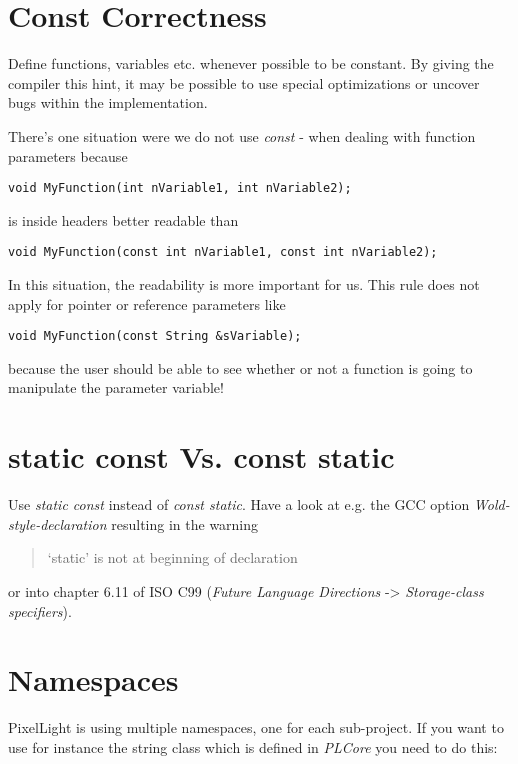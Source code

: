 \section{Const Correctness}
Define functions, variables etc. whenever possible to be constant. By giving the compiler this hint, it may be possible to use special optimizations or uncover bugs within the implementation.

There's one situation were we do not use \emph{const} - when dealing with function parameters because

\begin{lstlisting}[caption=Function parameters]
void MyFunction(int nVariable1, int nVariable2);
\end{lstlisting}

is inside headers better readable than

\begin{lstlisting}[caption=Constant function parameters]
void MyFunction(const int nVariable1, const int nVariable2);
\end{lstlisting}

In this situation, the readability is more important for us. This rule does not apply for pointer or reference parameters like

\begin{lstlisting}[caption=Constant function pointer/reference parameter]
void MyFunction(const String &sVariable);
\end{lstlisting}

because the user should be able to see whether or not a function is going to manipulate the parameter variable!




\section{static const Vs. const static}
Use \emph{static const} instead of \emph{const static}. Have a look at e.g. the \ac{GCC} option \emph{Wold-style-declaration} resulting in the warning \begin{quote}`static' is not at beginning of declaration\end{quote} or into chapter 6.11 of ISO C99 (\emph{Future Language Directions} -> \emph{Storage-class specifiers}).




\section{Namespaces}
PixelLight is using multiple namespaces, one for each sub-project. If you want to use for instance the string class which is defined in \emph{PLCore} you need to do this:

